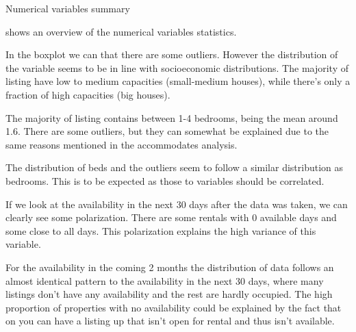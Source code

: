 
\begin{table}[H]
    \centering
    \caption{Numerical variables summary}%
    \label{tab:num_summary}
    \resizebox{\linewidth}{!}{%
    
}
\end{table}

 shows an overview of the numerical variables statistics.




In the boxplot we can that there are some outliers. However the distribution of
the variable seems to be in line with socioeconomic distributions. The majority
of listing have low to medium capacities (small-medium houses), while there's
only a fraction of high capacities (big houses).



The majority of listing contains between 1-4 bedrooms, being the mean around
1.6. There are some outliers, but they can somewhat be explained due to the same
reasons mentioned in the accommodates analysis.



The distribution of beds and the outliers seem to follow a similar distribution
as bedrooms.  This is to be expected as those to variables should be correlated.



If we look at the availability in the next 30 days after the data was taken, we
can clearly see some polarization. There are some rentals with 0 available days
and some close to all days. This polarization explains the high variance of this
variable.



For the availability in the coming 2 months the distribution of data
follows an almost identical pattern to the availability in the next
30 days, where many listings don't have any availability and the rest
are hardly occupied. The high proportion of properties with no
availability could be explained by the fact that on \airbnb
you can have a listing up that isn't open for rental and thus isn't
available.

